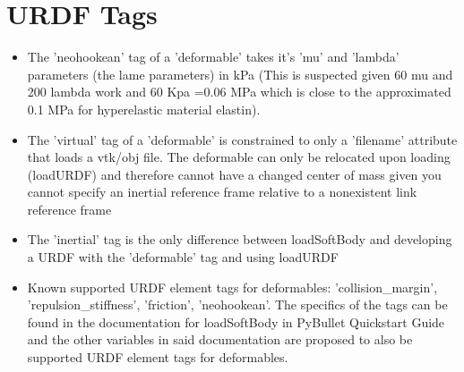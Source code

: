 \documentclass{article}
\begin{document}
\section{URDF Tags}
\begin{itemize}
    \item The 'neohookean' tag of a 'deformable' takes it's 'mu' and 'lambda' parameters (the lame parameters) in kPa (This is suspected given 60 mu and 200 lambda work and 60 Kpa =0.06 MPa which is close to the approximated 0.1 MPa for hyperelastic material elastin).
    \item The 'virtual' tag of a 'deformable' is constrained to only a 'filename' attribute that loads a vtk/obj file. The deformable can only be relocated upon loading (loadURDF) and therefore cannot have a changed center of mass given you cannot specify an inertial reference frame relative to a nonexistent link reference frame
    \item The 'inertial' tag is the only difference between loadSoftBody and developing a URDF with the 'deformable' tag and using loadURDF
    \item Known supported URDF element tags for deformables: 'collision\_margin', 'repulsion\_stiffness', 'friction', 'neohookean'. The specifics of the tags can be found in the documentation for loadSoftBody in PyBullet Quickstart Guide and the other variables in said documentation are proposed to also be supported URDF element tags for deformables.
\end{itemize}
\end{document}
